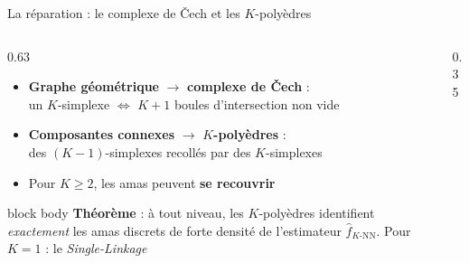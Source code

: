 \begin{frame}{La réparation : le complexe de \v{C}ech et les $K$-polyèdres}
    \begin{columns}[c, onlytextwidth]
        \begin{column}{0.63\textwidth}
            \begin{itemize}
                \setlength{\itemsep}{10pt}
                \item \textbf{Graphe géométrique} $\longrightarrow$ \textbf{complexe de \v{C}ech} :\\
                un $K$-simplexe $\Longleftrightarrow$ $K+1$ boules d'intersection non vide
                \item \textbf{Composantes connexes} $\longrightarrow$ \textbf{$K$-polyèdres} :\\
                des $(K-1)$-simplexes recollés par des $K$-simplexes
                \item Pour $K \ge 2$, les amas peuvent \textbf{se recouvrir}
            \end{itemize}

            \vspace{0.5cm}
            \begin{beamercolorbox}[rounded=true,sep=6pt]{block body}
                \small\textbf{Théorème}   : à tout niveau, les $K$-polyèdres identifient \emph{exactement} les amas discrets de forte densité de l'estimateur $\widehat f_{K\text{-NN}}$. Pour $K=1$ : le \emph{Single-Linkage}
            \end{beamercolorbox}

        \end{column}

        \begin{column}{0.35\textwidth}
            \begin{center}
                
            \end{center}
        \end{column}
    \end{columns}
\end{frame}

